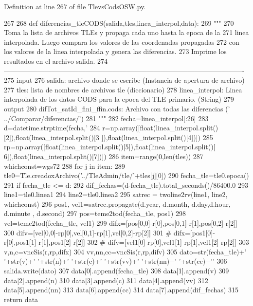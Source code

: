 \-Definition at line 267 of file \-Tlevs\-Cods\-O\-S\-W.\-py.


\begin{DoxyCode}
267 
268 def diferencias_tleCODS(salida,tles,linea_interpol,data):
269     """
270     Toma la lista de archivos TLEs y propaga cada uno hasta la epoca de la
271     linea interpolada. Luego compara los valores de las coordenadas propagadas
272     con los valores de la linea interpolada y genera las diferencias. 
273     Imprime los resultados en el archivo salida.     
274    
       ----------------------------------------------------------------------------------------------------------
275     input
276         salida: archivo donde se escribe (Instancia de apertura de archivo)
277         tles: lista de nombres de archivos tle (diccionario)
278         linea_interpol: Linea interpolada de los datos CODS para la epoca del
       TLE primario. (String)
279     output
280         difTot_satId_fini_ffin.cods: Archivo con todas las diferencias ('
      ../Comparar/diferencias/')
281     """
282     fecha=linea_interpol[:26]
283     d=datetime.strptime(fecha,'%
284     r=np.array([float(linea_interpol.split()[2]),float(linea_interpol.split()[3
      ]),float(linea_interpol.split()[4])])
285     rp=np.array([float(linea_interpol.split()[5]),float(linea_interpol.split()[
      6]),float(linea_interpol.split()[7])])
286     item=range(0,len(tles))
287     whichconst=wgs72
288     for j in item:
289         tle0=Tle.creadoxArchivo('../TleAdmin/tle/'+tles[j][0])
290         fecha_tle=tle0.epoca()
291         if fecha_tle <= d:
292             dif_fechas=(d-fecha_tle).total_seconds()/86400.0
293             line1=tle0.linea1
294             line2=tle0.linea2
295             satrec = twoline2rv(line1, line2, whichconst)
296             pos1, vel1=satrec.propagate(d.year, d.month, d.day,d.hour, d.minute
      , d.second)
297             pos=teme2tod(fecha_tle, pos1)
298             vel=teme2tod(fecha_tle, vel1)
299             difx=[pos[0,0]-r[0],pos[0,1]-r[1],pos[0,2]-r[2]]
300             difv=[vel[0,0]-rp[0],vel[0,1]-rp[1],vel[0,2]-rp[2]]
301 #             difx=[pos1[0]-r[0],pos1[1]-r[1],pos1[2]-r[2]]
302 #             difv=[vel1[0]-rp[0],vel1[1]-rp[1],vel1[2]-rp[2]]
303             v,n,c=vncSis(r,rp,difx)
304             vv,nn,cc=vncSis(r,rp,difv)
305             dato=str(fecha_tle)+' '+str(v)+' '+str(n)+' '+str(c)+' '+str(vv)+' 
      '+str(nn)+' '+str(cc)+'\n'
306             salida.write(dato)
307             data[0].append(fecha_tle)
308             data[1].append(v)
309             data[2].append(n)
310             data[3].append(c)
311             data[4].append(vv)
312             data[5].append(nn)
313             data[6].append(cc)
314             data[7].append(dif_fechas)
315     return data

\end{DoxyCode}


